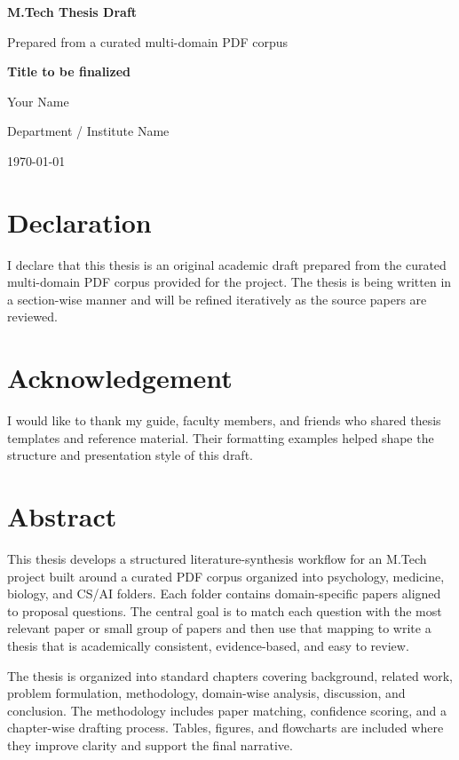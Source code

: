 \documentclass[12pt,a4paper,oneside]{book}
\begin{document}
\frontmatter

\begin{titlepage}
\centering
\vspace*{1.5cm}
{\Large \textbf{M.Tech Thesis Draft}\par}
\vspace{0.8cm}
{\large Prepared from a curated multi-domain PDF corpus\par}
\vspace{1.2cm}
{\large \textbf{Title to be finalized}\par}
\vfill
{\large Your Name\par}
{\large Department / Institute Name\par}
{\large \today\par}
\end{titlepage}

\chapter*{Declaration}
I declare that this thesis is an original academic draft prepared from the curated multi-domain PDF corpus provided for the project. The thesis is being written in a section-wise manner and will be refined iteratively as the source papers are reviewed.

\chapter*{Acknowledgement}
I would like to thank my guide, faculty members, and friends who shared thesis templates and reference material. Their formatting examples helped shape the structure and presentation style of this draft.

\chapter*{Abstract}
This thesis develops a structured literature-synthesis workflow for an M.Tech project built around a curated PDF corpus organized into psychology, medicine, biology, and CS/AI folders. Each folder contains domain-specific papers aligned to proposal questions. The central goal is to match each question with the most relevant paper or small group of papers and then use that mapping to write a thesis that is academically consistent, evidence-based, and easy to review.

The thesis is organized into standard chapters covering background, related work, problem formulation, methodology, domain-wise analysis, discussion, and conclusion. The methodology includes paper matching, confidence scoring, and a chapter-wise drafting process. Tables, figures, and flowcharts are included where they improve clarity and support the final narrative.
\end{document}
